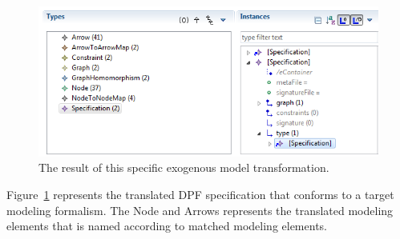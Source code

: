 \begin{figure}[H]
	\centering
	\includegraphics[scale=0.7]{./Figures/translated_model.png}
	\caption[The translated model for the case study.]
	{The result of this specific exogenous model transformation.}
	\label{fig:translated_model}
\end{figure}

Figure~\ref{fig:translated_model} represents the translated DPF specification
that conforms to a target modeling formalism. The Node and Arrows represents the
translated modeling elements that is named according to matched modeling
elements. 
